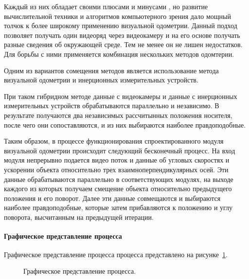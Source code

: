 Каждый из них обладает своими плюсами и минусами \cite{odometryMethods}, но развитие вычислительной техники и алгоритмов компьютерного зрения дало мощный толчок к более широкому применению визуальной одометрии. Данный подход позволяет получать один видеоряд через видеокамеру и на его основе получать разные сведения об окружающей среде. Тем не менее он не лишен недостатков. Для борьбы с ними применяется комбинация нескольких методов одомтерии. 

Одним из вариантов сомещения методов является использование метода визуальной одометрии и инерционных измерительных устройств. 

При таком гибридном методе данные с видеокамеры и данные с инерционных измерительных устройств обрабатываются параллельно и независимо. В результате получаются два независимых рассчитынных положения носителя, после чего они сопоставляются, и из них выбираются наиболее правдоподобные. 

Таким образом, в процессе функционирования спроектированного модуля визуальной одометрии происходит следующий бесконечный процесс. 
На вход модуля непрерывно подается видео поток и данные об угловых скоростях и ускорении объекта относительно трех взаимноперпендикулярных осей. Эти данные обрабатываются параллельно в соответствующих модулях, на выходе каждого из которых получаем смещение объекта относительно предыдущего положения и его поворот. Далее эти данные совмещаются и выбираются наиболее правдоподобные, которые затем прибавляются к положению и углу поворота, высчитанным на предыдущей итерации. 


\paragraph{Графическое представление процесса}
Графическое представление процесса процесса представлено на рисунке~\ref{pic:predmetOblast}.

\begin{figure}[!htb]
\caption{Графическое представление процесса.}
\label{pic:predmetOblast}
\end{figure}

